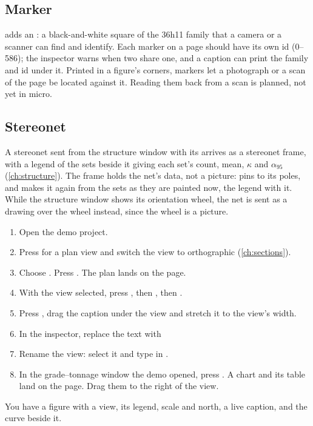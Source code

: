 \subsection{Marker}

 adds an : a black-and-white square of the 36h11 family that a camera or a scanner can find and identify. Each marker on a page should have its own id (0–586); the inspector warns when two share one, and a caption can print the family and id under it. Printed in a figure's corners, markers let a photograph or a scan of the page be located against it. Reading them back from a scan is planned, not yet in micro.

\subsection{Stereonet}

A stereonet sent from the structure window with its  arrives as a stereonet frame, with a legend of the sets beside it giving each set's count, mean, $\kappa$ and $\alpha_{95}$ (\cref{ch:structure}). The frame holds the net's data, not a picture:  pins to its poles, and  makes it again from the sets as they are painted now, the legend with it. While the structure window shows its orientation wheel, the net is sent as a drawing over the wheel instead, since the wheel is a picture.

\begin{tryit}
\begin{enumerate}
\item Open the demo project.
\item Press  for a plan view and switch the view to orthographic (\cref{ch:sections}).
\item Choose . Press . The plan lands on the page.
\item With the view selected, press , then , then .
\item Press , drag the caption under the view and stretch it to the view's width.
\item In the inspector, replace the text with\\
\item Rename the view: select it and type  in .
\item In the grade–tonnage window the demo opened, press . A chart and its table land on the page. Drag them to the right of the view.
\end{enumerate}
You have a figure with a view, its legend, scale and north, a live caption, and the curve beside it.
\end{tryit}

